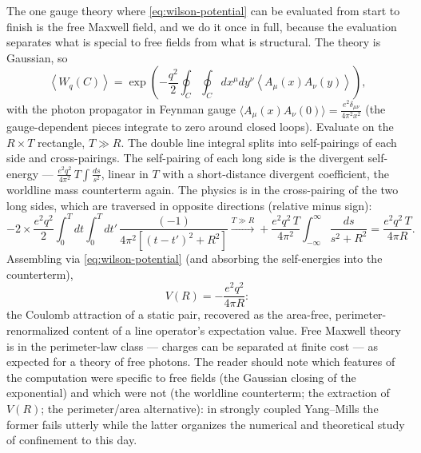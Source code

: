 \begin{eexample}
\label{ex:maxwell-wilson}
The one gauge theory where \eqref{eq:wilson-potential} can be evaluated
from start to finish is the free Maxwell field, and we do it once in
full, because the evaluation separates what is special to free fields
from what is structural. The theory is Gaussian, so
\begin{equation}
\left\langle W_q(C) \right\rangle
= \exp\left( -\frac{q^2}{2} \oint_C \oint_C dx^\mu dy^\nu
\left\langle A_\mu(x) A_\nu(y) \right\rangle \right),
\label{eq:maxwell-w-gaussian}
\end{equation}
with the photon propagator in Feynman gauge $\langle A_\mu(x)
A_\nu(0)\rangle = \frac{e^2 \delta_{\mu\nu}}{4\pi^2 x^2}$ (the
gauge-dependent pieces integrate to zero around closed loops). Evaluate
on the $R \times T$ rectangle, $T \gg R$. The double line integral
splits into self-pairings of each side and cross-pairings. The
self-pairing of each long side is the divergent self-energy ---
$\frac{e^2 q^2}{4\pi^2}\, T \int \frac{ds}{s^2}$, linear in $T$ with a
short-distance divergent coefficient, the worldline mass counterterm
again. The physics is in the cross-pairing of the two long sides, which
are traversed in opposite directions (relative minus sign):
\begin{equation}
-2 \times \frac{e^2 q^2}{2}
\int_0^T dt \int_0^T dt'\,
\frac{(-1)}{4\pi^2\left[(t - t')^2 + R^2\right]}
\xrightarrow{T \gg R}
+ \frac{e^2 q^2\, T}{4\pi^2} \int_{-\infty}^{\infty}
\frac{ds}{s^2 + R^2}
= \frac{e^2 q^2\, T}{4\pi R}.
\end{equation}
Assembling via \eqref{eq:wilson-potential} (and absorbing the
self-energies into the counterterm),
\begin{equation}
V(R) = -\frac{e^2 q^2}{4\pi R}:
\label{eq:coulomb-from-loop}
\end{equation}
the Coulomb attraction of a static pair, recovered as the area-free,
perimeter-renormalized content of a line operator's expectation value.
Free Maxwell theory is in the perimeter-law class --- charges can be
separated at finite cost --- as expected for a theory of free photons.
The reader should note which features of the computation were specific
to free fields (the Gaussian closing of the exponential) and which were
not (the worldline counterterm; the extraction of $V(R)$; the
perimeter/area alternative): in strongly coupled Yang--Mills the former
fails utterly while the latter organizes the numerical and theoretical
study of confinement to this day.
\end{eexample}

